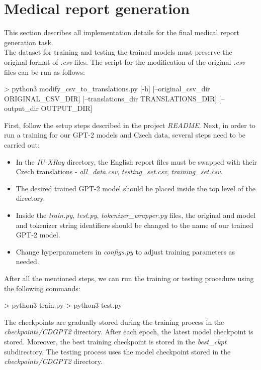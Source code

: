 \section{Medical report generation}
\label{sec:MedRepGenImpl}
This section describes all implementation details for the final medical report generation task. \\

The dataset for training and testing the trained models must preserve the original format of \textit{.csv} files. The script for the modification of the original \textit{.csv} files can be run as follows:
\begin{code}
> python3 modify_csv_to_translations.py [-h] 
                                [--original_csv_dir ORIGINAL_CSV_DIR] 
                                [--translations_dir TRANSLATIONS_DIR]
                                [--output_dir OUTPUT_DIR]
\end{code}

First, follow the setup steps described in the project \textit{README}. Next, in order to run a training for our GPT-2 models and Czech data, several steps need to be carried out:
\begin{itemize}
	\item In the \textit{IU-XRay} directory, the English report files must be swapped with their Czech translations - \textit{all\_data.csv}, \textit{testing\_set.csv}, \textit{training\_set.csv}.
	\item The desired trained GPT-2 model should be placed inside the top level of the directory.
	\item Inside the \textit{train.py}, \textit{test.py}, \textit{tokenizer\_wrapper.py} files, the original  and  model and tokenizer string identifiers should be changed to the name of our trained GPT-2 model.
	\item Change hyperparameters in \textit{configs.py} to adjust training parameters as needed.
\end{itemize}

After all the mentioned steps, we can run the training or testing procedure using the following commands:
\begin{code}
> python3 train.py
> python3 test.py
\end{code}

The checkpoints are gradually stored during the training process in the \textit{checkpoints/CDGPT2} directory. After each epoch, the latest model checkpoint is stored. Moreover, the best training checkpoint is stored in the \textit{best\_ckpt} subdirectory. The testing process uses the model checkpoint stored in the \textit{checkpoints/CDGPT2} directory.\\

